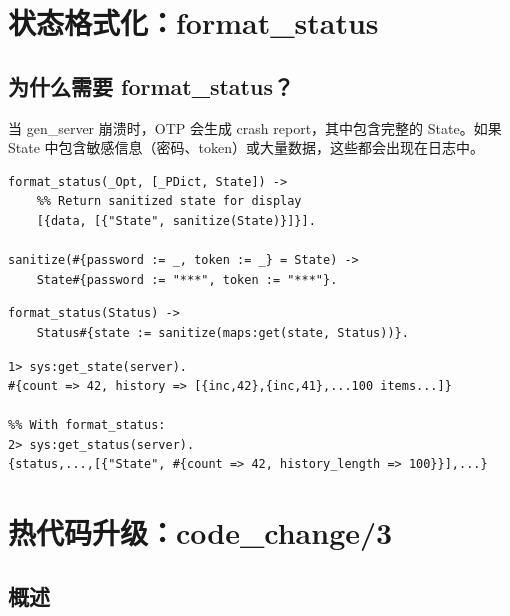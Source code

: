 \documentclass[a4paper,11pt]{article}
\begin{document}
\section{状态格式化：format\_status}

\subsection{为什么需要 format\_status？}

当 gen\_server 崩溃时，OTP 会生成 crash report，其中包含完整的 State。如果 State 中包含敏感信息（密码、token）或大量数据，这些都会出现在日志中。

\begin{lstlisting}[style=erlangstyle, caption={format\_status/2 回调（OTP 25 之前）}]
%% Called by sys:get_status and crash reports
format_status(_Opt, [_PDict, State]) ->
    %% Return sanitized state for display
    [{data, [{"State", sanitize(State)}]}].

sanitize(#{password := _, token := _} = State) ->
    State#{password := "***", token := "***"}.
\end{lstlisting}

\begin{lstlisting}[style=erlangstyle, caption={format\_status/1 回调（OTP 25+，新格式）}]
%% New format_status/1 (OTP 25+)
format_status(Status) ->
    Status#{state := sanitize(maps:get(state, Status))}.
\end{lstlisting}

\begin{lstlisting}[style=shellstyle, caption={format\_status 效果对比}]
%% Without format_status:
1> sys:get_state(server).
#{count => 42, history => [{inc,42},{inc,41},...100 items...]}

%% With format_status:
2> sys:get_status(server).
{status,...,[{"State", #{count => 42, history_length => 100}}],...}
\end{lstlisting}


\section{热代码升级：code\_change/3}

\subsection{概述}
\end{document}
